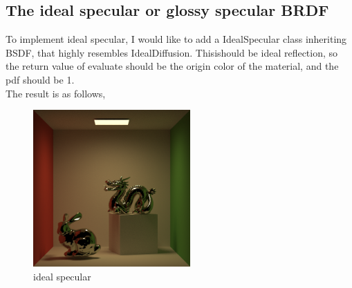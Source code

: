 \documentclass[acmtog]{acmart}
\begin{document}
\subsection{The ideal specular or glossy specular BRDF}
To implement ideal specular,
I would like to add a IdealSpecular class inheriting BSDF,
that highly resembles IdealDiffusion. Thisishould be ideal reflection, so the return value of evaluate should be the origin color of the material, and the pdf should be 1.\\
The result is as follows,
\begin{figure}[h]
	\includegraphics[width=6.0cm,height=6.0cm]{specular.png}
	\caption{ideal specular}
\end{figure}\\
\end{document}
